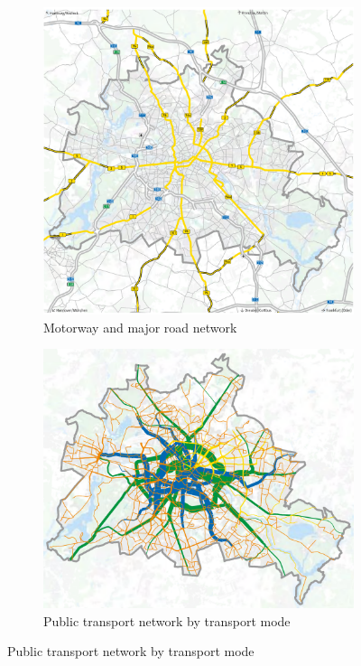 \begin{figure}

	\begin{subfigure}[b]{.5\linewidth}
		\includegraphics[width=\linewidth]{MobilityInTheCityJPG/Graphs/Motorways.pdf}
		\caption{Motorway and major road network}
		\label{Motorways}
	\end{subfigure}
	\begin{subfigure}[b]{.5\linewidth}
		\includegraphics[width=\linewidth]{MobilityInTheCityJPG/Graphs/PTnetwork.pdf}
		\caption{Public transport network by transport mode}
		\label{PTnetwork}
	\end{subfigure}
\end{figure}


